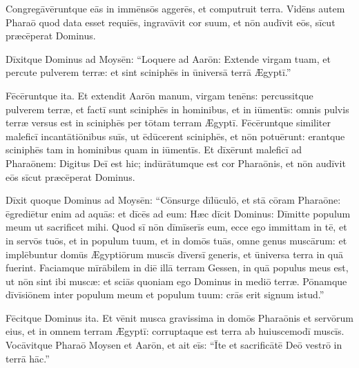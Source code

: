 Congregāvēruntque eās in immēnsōs
aggerēs, et computruit terra.  Vidēns autem
Pharaō quod data esset requiēs, ingravāvit cor suum, et nōn
audīvit eōs, sīcut præcēperat Dominus. 

Dīxitque Dominus ad Moysēn: ``Loquere ad Aarōn: Extende
virgam tuam, et percute pulverem terræ: et sint
sciniphēs in ūniversā terrā Ægyptī.''

Fēcēruntque ita. Et
extendit Aarōn manum, virgam tenēns: percussitque pulverem
terræ, et factī sunt sciniphēs in hominibus, et in
iūmentīs: omnis pulvis terræ versus est in
sciniphēs per tōtam terram Ægyptī.  Fēcēruntque
similiter maleficī
incantātiōnibus suīs, ut ēdūcerent
sciniphēs, et nōn potuērunt: erantque
sciniphēs tam in hominibus quam in
iūmentīs.  Et dīxērunt maleficī ad
Pharaōnem: Digitus Deī est hic; indūrātumque est cor Pharaōnis, et nōn audīvit eōs
sīcut præcēperat Dominus.  

Dīxit quoque
Dominus ad Moysēn: ``Cōnsurge
dīlūculō, et stā cōram Pharaōne:
ēgrediētur enim ad aquās: et dīcēs ad eum: Hæc dīcit Dominus: Dīmitte
populum meum ut sacrificet mihi.  Quod sī nōn dīmīserīs eum, ecce ego
immittam in tē, et in servōs tuōs,
et in populum tuum, et in domōs tuās, omne genus muscārum:
et implēbuntur domūs Ægyptiōrum muscīs
dīversī generis, et ūniversa terra in quā fuerint. 
Faciamque mīrābilem in diē illā terram Gessen, in quā populus meus est, ut
nōn sint ibi muscæ: et sciās quoniam ego Dominus in mediō
terræ.  Pōnamque dīvīsiōnem inter populum meum et populum
tuum: crās erit signum istud.''

Fēcitque Dominus ita. Et vēnit
musca gravissima in domōs Pharaōnis et
servōrum eius, et in omnem terram Ægyptī: corruptaque est
terra ab huiuscemodī muscīs.  Vocāvitque
Pharaō Moysen et Aarōn, et ait eīs: ``Īte et
sacrificātē Deō vestrō in terrā hāc.''  

